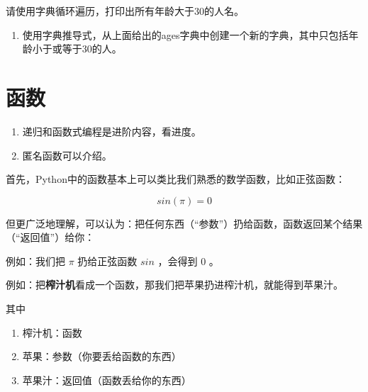 \documentclass[
  letterpaper,
  DIV=11,
  numbers=noendperiod]{scrreprt}
\providecommand{\tightlist}{%
  \setlength{\itemsep}{0pt}\setlength{\parskip}{0pt}}\usepackage{longtable,booktabs,array}
\begin{document}
请使用字典循环遍历，打印出所有年龄大于30的人名。

\begin{enumerate}
\def\labelenumi{\arabic{enumi}.}
\setcounter{enumi}{1}
\tightlist
\item
  使用字典推导式，从上面给出的ages字典中创建一个新的字典，其中只包括年龄小于或等于30的人。
\end{enumerate}

\hypertarget{ux51fdux6570}{%
\chapter{函数}\label{ux51fdux6570}}

\begin{tcolorbox}[enhanced jigsaw, opacityback=0, left=2mm, coltitle=black, leftrule=.75mm, bottomtitle=1mm, arc=.35mm, opacitybacktitle=0.6, bottomrule=.15mm, breakable, colbacktitle=quarto-callout-note-color!10!white, toprule=.15mm, toptitle=1mm, colframe=quarto-callout-note-color-frame, titlerule=0mm, title=\textcolor{quarto-callout-note-color}{\faInfo}\hspace{0.5em}{Note}, rightrule=.15mm, colback=white]

\begin{enumerate}
\def\labelenumi{\arabic{enumi}.}
\tightlist
\item
  递归和函数式编程是进阶内容，看进度。
\item
  匿名函数可以介绍。
\end{enumerate}

\end{tcolorbox}

首先，Python中的函数基本上可以类比我们熟悉的数学函数，比如正弦函数：

\[
sin(\pi) = 0
\]

但更广泛地理解，可以认为：把任何东西（``参数''）扔给函数，函数返回某个结果（``返回值''）给你：

例如：我们把 \(\pi\) 扔给正弦函数 \(sin\) ，会得到 \(0\) 。

例如：把\textbf{榨汁机}看成一个函数，那我们把苹果扔进榨汁机，就能得到苹果汁。

其中

\begin{enumerate}
\def\labelenumi{\arabic{enumi}.}
\tightlist
\item
  榨汁机：函数
\item
  苹果：参数（你要丢给函数的东西）
\item
  苹果汁：返回值（函数丢给你的东西）
\end{enumerate}
\end{document}
